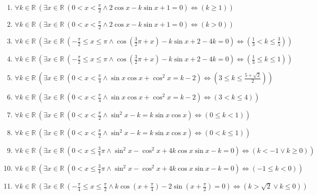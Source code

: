 \documentclass[11pt,a4paper]{article}
\begin{document}
\begin{enumerate}
\item $\displaystyle \forall k \in \mathbb{R}\ \left( \exists x \in \mathbb{R}\ \left( 0 < x < \frac{\pi}{2} \land 2\cos x - k\sin x + 1 = 0 \right) \iff \left( k \ge 1 \right) \right)$
\item $\displaystyle \forall k \in \mathbb{R}\ \left( \exists x \in \mathbb{R}\ \left( 0 < x < \frac{\pi}{2} \land 2\cos x - k\sin x + 1 = 0 \right) \iff \left( k > 0 \right) \right)$
\item $\displaystyle \forall k \in \mathbb{R}\ \left( \exists x \in \mathbb{R}\ \left( -\frac{\pi}{2} \le x \le \pi \land \cos\left(\frac{3}{2}\pi + x\right) - k\sin x + 2 - 4k = 0 \right) \iff \left( \frac{1}{3} < k \le \frac{3}{5} \right) \right)$
\item $\displaystyle \forall k \in \mathbb{R}\ \left( \exists x \in \mathbb{R}\ \left( -\frac{\pi}{2} \le x \le \pi \land \cos\left(\frac{3}{2}\pi + x\right) - k\sin x + 2 - 4k = 0 \right) \iff \left( \frac{1}{3} \le k \le 1 \right) \right)$
\item $\displaystyle \forall k \in \mathbb{R}\ \left( \exists x \in \mathbb{R}\ \left( 0 < x < \frac{\pi}{4} \land \sin x \cos x + \cos^{2} x = k - 2 \right) \iff \left( 3 \le k \le \frac{5 + \sqrt{2}}{2} \right) \right)$
\item $\displaystyle \forall k \in \mathbb{R}\ \left( \exists x \in \mathbb{R}\ \left( 0 < x < \frac{\pi}{4} \land \sin x \cos x + \cos^{2} x = k - 2 \right) \iff \left( 3 < k \le 4 \right) \right)$
\item $\displaystyle \forall k \in \mathbb{R}\ \left( \exists x \in \mathbb{R}\ \left( 0 < x < \frac{\pi}{2} \land \sin^{2} x - k = k\sin x \cos x \right) \iff \left( 0 \le k < 1 \right) \right)$
\item $\displaystyle \forall k \in \mathbb{R}\ \left( \exists x \in \mathbb{R}\ \left( 0 < x < \frac{\pi}{2} \land \sin^{2} x - k = k\sin x \cos x \right) \iff \left( 0 < k \le 1 \right) \right)$
\item $\displaystyle \forall k \in \mathbb{R}\ \left( \exists x \in \mathbb{R}\ \left( 0 < x \le \frac{3}{4}\pi \land \sin^{2} x - \cos^{2} x + 4k\cos x \sin x - k = 0 \right) \iff \left( k < -1 \lor k \ge 0 \right) \right)$
\item $\displaystyle \forall k \in \mathbb{R}\ \left( \exists x \in \mathbb{R}\ \left( 0 < x \le \frac{3}{4}\pi \land \sin^{2} x - \cos^{2} x + 4k\cos x \sin x - k = 0 \right) \iff \left( -1 \le k < 0 \right) \right)$
\item $\displaystyle \forall k \in \mathbb{R}\ \left( \exists x \in \mathbb{R}\ \left( -\frac{\pi}{4} \le x \le \frac{\pi}{2} \land k\cos\left(x + \frac{\pi}{4}\right) - 2\sin\left(x + \frac{\pi}{2}\right) = 0 \right) \iff \left( k > \sqrt{2} \lor k \le 0 \right) \right)$

\end{enumerate}
\end{document}
